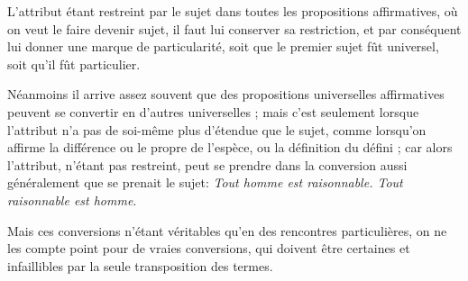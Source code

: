 L'attribut étant restreint par le sujet dans toutes les propositions affirmatives, où on veut le faire devenir sujet, il faut lui conserver sa restriction, et par conséquent lui donner une marque de particularité, soit que le premier sujet fût universel, soit qu'il fût particulier.

Néanmoins il arrive assez souvent que des propositions universelles affirmatives peuvent se convertir en d'autres universelles ; mais c'est seulement lorsque l'attribut n'a pas de soi-même plus d'étendue que le sujet, comme lorsqu'on affirme la différence ou le propre de l'espèce, ou la définition du défini ; car alors l'attribut, n'étant pas restreint, peut se prendre dans la conversion aussi généralement que se prenait le sujet: \emph{Tout homme est raisonnable. Tout raisonnable est homme}.

Mais ces conversions n'étant véritables qu'en des rencontres particulières, on ne les compte point pour de vraies conversions, qui doivent être certaines et infaillibles par la seule transposition des termes.

